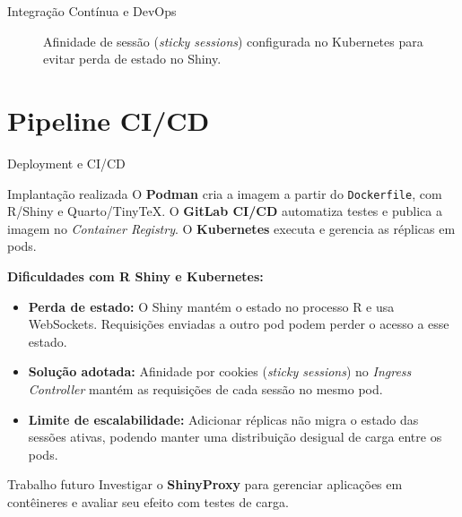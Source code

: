 \documentclass[10pt, aspectratio=169]{beamer}
\begin{document}
\begin{frame}{Integração Contínua e DevOps}
\begin{figure}[H]
{%
        }
        \caption{Afinidade de sessão (\textit{sticky sessions}) configurada no Kubernetes para evitar perda de estado no Shiny.}
    \end{figure}
\end{frame}

\section{Pipeline CI/CD}

\begin{frame}{Deployment e CI/CD}
    \small
    \begin{block}{Implantação realizada}
        O \textbf{Podman} cria a imagem a partir do \texttt{Dockerfile},
        com R/Shiny e Quarto/TinyTeX. O \textbf{GitLab CI/CD} automatiza
        testes e publica a imagem no \textit{Container Registry}.
        O \textbf{Kubernetes} executa e gerencia as réplicas em pods.
    \end{block}

    \vspace{0.15cm}
    \textbf{Dificuldades com R Shiny e Kubernetes:}
    \begin{itemize}
        \item \textbf{Perda de estado:} O Shiny mantém o estado no processo R
        e usa WebSockets. Requisições enviadas a outro pod podem perder
        o acesso a esse estado.

        \item \textbf{Solução adotada:} Afinidade por cookies
        (\textit{sticky sessions}) no \textit{Ingress Controller}
        mantém as requisições de cada sessão no mesmo pod.

        \item \textbf{Limite de escalabilidade:} Adicionar réplicas não
        migra o estado das sessões ativas, podendo manter uma
        distribuição desigual de carga entre os pods.
    \end{itemize}

    \vspace{0.1cm}
    \begin{block}{Trabalho futuro}
        Investigar o \textbf{ShinyProxy} para gerenciar aplicações em
        contêineres e avaliar seu efeito com testes de carga.
    \end{block}
\end{frame}
\end{document}
